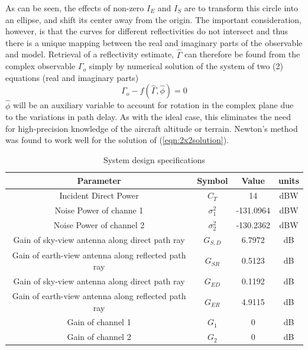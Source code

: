 \documentclass[draftcls,onecolumn]{IEEEtran}  %
\begin{document}
As can be seen, the effects of non-zero $I_E$ and $I_S$ are to transform this circle into an ellipse, and shift its center away from the origin. 
The important consideration, however, is that the curves for different reflectivities do not intersect and thus there is a unique mapping between the real and imaginary parts of the observable and model.  
Retrieval of a reflectivity estimate, $\hat{\Gamma}$ can therefore be found from the complex observable $\Gamma_{o}$ simply by numerical solution of the system of two (2) equations (real and imaginary parts) 
\begin{equation}
\Gamma_{o} - f(\hat{\Gamma}, \hat{\phi}) = 0
\label{eqn:2x2solution}
\end{equation}
$\hat{\phi}$ will be an auxiliary variable to account for  rotation in the complex plane due to the variations in path delay.  
As with the ideal case, this eliminates the need for high-precision knowledge of the aircraft altitude or terrain.  
Newton's method was found to work well for the solution of (\ref{eqn:2x2solution}). 

\begin{table}[ht]
\centering
\caption{System design specifications}
\begin{tabular}  {|c|c|c|c|}
	\hline
     \textbf{Parameter} & \textbf{Symbol}	& \textbf{Value} &	\textbf{units}  \\
     \hline
     Incident Direct Power &	$C_T$ & 14  & 	dBW	\\
          \hline
     Noise Power of channe 1&	 $\sigma_1^2$ & -131.0964  & 	dBW	\\
     \hline
      Noise Power of channel 2&	$\sigma_2^2$ & -130.2362  & 	dBW	\\
     \hline
     Gain of sky-view antenna along direct path ray &	$G_{S,D}$ & 6.7972  & 	dB	\\
    \hline
         Gain of earth-view antenna along reflected path ray&	$G_{SR}$ & 0.5123  & 	dB	\\
    \hline
         Gain of sky-view antenna along direct path ray &	$G_{ED}$ & 0.1192  & 	dB	\\
    \hline
             Gain of earth-view antenna along reflected path ray &	$G_{ER}$ & 4.9115  & 	dB	\\
    \hline
    Gain of channel 1 &	$G_1$ & 0  & 	dB	\\
    \hline
    Gain of channel 2 &	$G_2$ & 0  & 	dB	\\
    \hline
\end{tabular}
\label{tab:sysparam}
\end{table}
\end{document}
